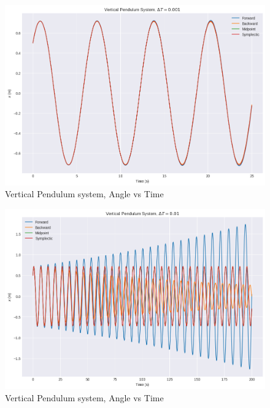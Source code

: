 \documentclass[11pt]{article}
\begin{document}
\begin{figure}[H]
    \centering
    \includegraphics[width=\linewidth]{../vp3.png}
    \caption*{Vertical Pendulum system, Angle vs Time}
\end{figure}

\begin{figure}[H]
    \centering
    \includegraphics[width=\linewidth]{../vp4.png}
    \caption*{Vertical Pendulum system, Angle vs Time}
\end{figure}
\end{document}
